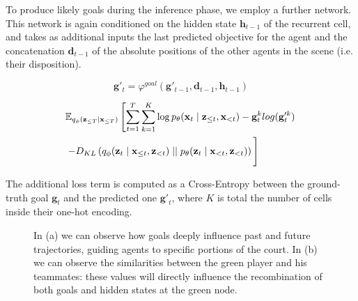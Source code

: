 \documentclass[10pt,a4paper,conference]{IEEEtran}
\begin{document}
To produce likely goals during the inference phase, we employ a further network. This network is again conditioned on the hidden state $\mathbf{h}_{t-1}$ of the recurrent cell, and takes as additional inputs the last predicted objective for the agent and the concatenation $\mathbf{d}_{t-1}$ of the absolute positions of the other agents in the scene (i.e. their disposition).

\begin{equation}
    \label{eq:goals_net}
    \mathbf{g}'_{t} = \varphi^{goal}(\mathbf{g}'_{t-1}, \mathbf{d}_{t-1}, \mathbf{h}_{t-1})
\end{equation}

\begin{equation}
\label{eq:elbo_vrnn_goals}
\begin{split}
    &\mathbb{E}_{q_{\phi}(\mathbf{z}_{\leq T} \mid \mathbf{x}_{\leq T})} 
    \left [
        \sum_{t=1}^{T}\sum_{k=1}^{K} \log p_{\theta}(\mathbf{x}_{t} \mid \mathbf{z}_{\leq t}, \mathbf{x}_{<t}) - \mathbf{g}^{k}_{t} log(\mathbf{g}'^{k}_{t})\right. \\
            &
            \left. - D_{KL} \left ( 
                q_{\phi}(\mathbf{z}_{t} \mid \mathbf{x}_{\leq t}, \mathbf{z}_{< t}) \mid \mid p_{\theta}(\mathbf{z}_{t} \mid \mathbf{x}_{< t}, \mathbf{z}_{< t})
            \right ) 
    \vphantom{\sum^{T}} \right ] 
\end{split}
\end{equation}

The additional loss term is computed as a Cross-Entropy between the ground-truth goal $\mathbf{g}_{t}$ and the predicted one $\mathbf{g'}_{t}$, where $K$ is total the number of cells inside their one-hot encoding.

\begin{figure}[!t]\centering
   \vspace{3pt}
    \qquad
    \qquad
    \caption{In (a) we can observe how goals deeply influence past and future trajectories, guiding agents to specific portions of the court. In (b) we can observe the similarities between the green player and his teammates: these values will directly influence the recombination of both goals and hidden states at the green node.}
    \label{fig:goals_and_similaritiesa}
\end{figure}
\end{document}

